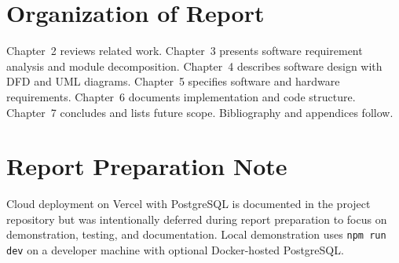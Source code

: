 \section{Organization of Report}
Chapter~2 reviews related work. Chapter~3 presents software requirement analysis and module decomposition. Chapter~4 describes software design with DFD and UML diagrams. Chapter~5 specifies software and hardware requirements. Chapter~6 documents implementation and code structure. Chapter~7 concludes and lists future scope. Bibliography and appendices follow.

\section{Report Preparation Note}
Cloud deployment on Vercel with PostgreSQL is documented in the project repository but was intentionally deferred during report preparation to focus on demonstration, testing, and documentation. Local demonstration uses \texttt{npm run dev} on a developer machine with optional Docker-hosted PostgreSQL.
